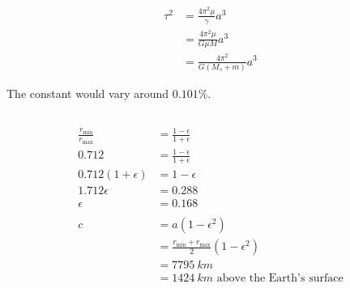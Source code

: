 \documentclass{article}
\begin{document}
\begin{align*}
  \tau^2 & = \frac{4 \pi^2 \mu}{\gamma} a^3  \\
         & = \frac{4 \pi^2 \mu}{G \mu M} a^3 \\
         & = \frac{4 \pi^2}{G (M_s + m)} a^3
\end{align*}

The constant would vary around $0.101\%$.

\setcounter{subsection}{18}
\subsection{}

\begin{align*}
  \frac{r_\text{min}}{r_\text{max}} & = \frac{1 - \epsilon}{1 + \epsilon}                      \\
  0.712                             & = \frac{1 - \epsilon}{1 + \epsilon}                      \\
  0.712 (1 + \epsilon)              & = 1 - \epsilon                                           \\
  1.712 \epsilon                    & = 0.288                                                  \\
  \epsilon                          & = 0.168                                                  \\ \\
  c                                 & = a (1 - \epsilon^2)                                     \\
                                    & = \frac{r_\text{min} + r_\text{max}}{2} (1 - \epsilon^2) \\
                                    & = \qty{7795}{km}                                         \\
                                    & = \qty{1424}{km} \text{ above the Earth's surface}
\end{align*}
\end{document}
